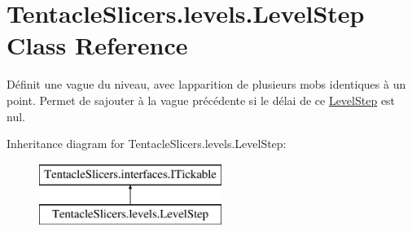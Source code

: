 \hypertarget{class_tentacle_slicers_1_1levels_1_1_level_step}{}\section{Tentacle\+Slicers.\+levels.\+Level\+Step Class Reference}
\label{class_tentacle_slicers_1_1levels_1_1_level_step}


Définit une vague du niveau, avec l\textquotesingle{}apparition de plusieurs mobs identiques à un point. Permet de s\textquotesingle{}ajouter à la vague précédente si le délai de ce \hyperlink{class_tentacle_slicers_1_1levels_1_1_level_step}{Level\+Step} est nul.  


Inheritance diagram for Tentacle\+Slicers.\+levels.\+Level\+Step\+:\begin{figure}[H]
\begin{center}
\leavevmode
\includegraphics[height=2.000000cm]{class_tentacle_slicers_1_1levels_1_1_level_step}
\end{center}
\end{figure}

